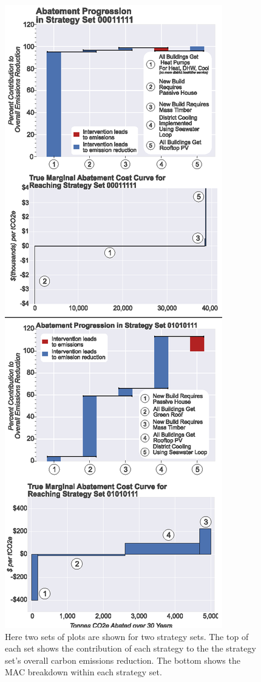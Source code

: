 \documentclass[twocolumn, a4paper,10pt]{article}
\begin{document}
\begin{figure}[hbpt]
    \centering
    \captionsetup{margin=.5cm}
    \includegraphics[scale=0.95]{figures/true_maccs_waterfalls_both.eps}
    \caption{Here two sets of plots are shown for two strategy sets. The top of each set shows the contribution of each strategy to the the strategy set's overall carbon emissions reduction. The bottom shows the MAC breakdown within each strategy set.}
    \label{fig:true_macc_both}
\end{figure}
\end{document}
